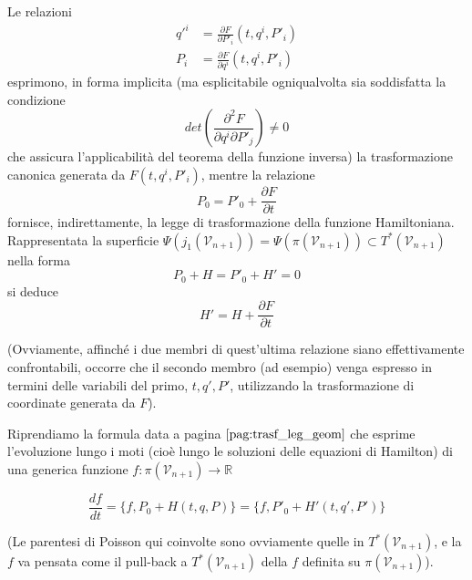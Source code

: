
Le relazioni
\begin{align*}
	q'^i &= \frac{\partial F}{\partial P'_i} (t, q^i, P'_i)\\
	P_i &= \frac{\partial F}{\partial q^i} (t, q^i, P'_i)
\end{align*}
esprimono, in forma implicita (ma esplicitabile ogniqualvolta sia soddisfatta la condizione
\begin{equation*}
	det \left( \frac{\partial^2 F}{\partial q^i \partial P'_j} \right) \neq 0
\end{equation*}
che assicura l'applicabilità del teorema della funzione inversa) la trasformazione canonica generata da $ F (t, q^i, P'_i) $, mentre la relazione
\begin{equation*}
	P_0 = P'_0 + \frac{\partial F}{\partial t}
\end{equation*}
fornisce, indirettamente, la legge di trasformazione della funzione Hamiltoniana. Rappresentata la superficie $ \Psi (j_1 (\mathcal{V}_{n+1})) = \Psi (\pi (\mathcal{V}_{n+1})) \subset T^* (\mathcal{V}_{n+1}) $ nella forma
\begin{equation*}
	P_0 + H = P'_0 + H' = 0
\end{equation*}
si deduce
\begin{equation*}
	H' = H + \frac{\partial F}{\partial t}
\end{equation*}

(Ovviamente, affinché i due membri di quest'ultima relazione siano effettivamente confrontabili, occorre che il secondo membro (ad esempio) venga espresso in termini delle variabili del primo, $ t, q', P' $, utilizzando la trasformazione di coordinate generata da $ F $).

Riprendiamo la formula data a pagina $ \pageref{pag:trasf_leg_geom} $ che esprime l'evoluzione lungo i moti (cioè lungo le soluzioni delle equazioni di Hamilton) di una generica funzione $ f: \pi (\mathcal{V}_{n+1}) \longrightarrow \mathbb{R} $

\begin{equation*}
	\frac{df}{dt} = \{f, P_0 + H (t, q, P) \} = \{f, P'_0 + H' (t, q', P') \}
\end{equation*}

(Le parentesi di Poisson qui coinvolte sono ovviamente quelle in $ T^* (\mathcal{V}_{n+1}) $, e la $ f $ va pensata come il pull-back a $ T^* (\mathcal{V}_{n+1}) $ della $ f $ definita su $ \pi (\mathcal{V}_{n+1}) $).

